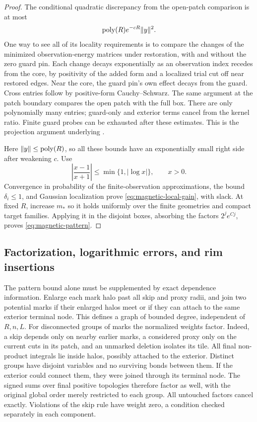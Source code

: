 \begin{proof}
The conditional quadratic discrepancy from the open-patch
comparison is at most
\[
                    {\rm poly}(R)e^{-cR}\lVert y\rVert^2.
\]
One way to see all of its
locality requirements is to compare the changes of the
minimized observation-energy matrices under restoration,
with and without the zero guard pin. Each change decays
exponentially as an observation index recedes from the core,
by positivity of the added form and a localized trial cut
off near restored edges. Near the core, the guard pin's
own effect decays from the guard. Cross entries follow
by positive-form Cauchy--Schwarz. The same argument at
the patch boundary compares the open patch with the full
box. There are only polynomially many entries; guard-only
and exterior terms cancel from the kernel ratio.
Finite guard probes can be exhausted after these estimates.
This is the projection argument underlying .

Here \(\lVert y\rVert\le{\rm poly}(R)\), so all these bounds have an
exponentially small right side after weakening \(c\).
Use
\[
 \left|\frac{x-1}{x+1}\right|
                       \le\min\{1,|\log x|\},\qquad x>0.
\]
Convergence in probability of the finite-observation
approximations, the bound \(\delta_i\le1\), and Gaussian
localization prove \eqref{eq:magnetic-local-gain}, with slack.
At fixed \(R\), increase \(m_*\) so it holds uniformly over
the finite geometries and compact target families. Applying
it in the disjoint boxes, absorbing the factors \(2^j e^{Cj}\),
proves \eqref{eq:magnetic-pattern}.
\end{proof}

\subsection{Factorization, logarithmic errors, and rim insertions}

The pattern bound alone must be supplemented by exact dependence
information. Enlarge each mark halo past all skip and proxy radii,
and join two potential marks if their enlarged halos meet or
if they can attach to the same exterior terminal node. This
defines a graph of bounded degree, independent of \(R,n,L\).
For disconnected groups of marks the normalized weights factor.
Indeed, a skip depends only on nearby earlier marks, a considered
proxy only on the current cuts in its patch, and an unmarked
deletion isolates its tile. All final non-product integrals lie
inside halos, possibly attached to the exterior. Distinct groups
have disjoint variables and no surviving bonds between them.
If the exterior could connect them, they were joined through its
terminal node. The signed sums over final positive topologies
therefore factor as well, with the original global order merely
restricted to each group. All untouched factors cancel exactly.
Violations of the skip rule have weight zero, a condition
checked separately in each component.

